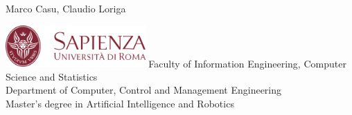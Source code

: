 \documentclass[10pt, letterpaper]{report}
\title{\titolo} %
\author{Marco Casu, Claudio Loriga}
\date{\vspace{-5ex}}
\begin{document}
\begin{titlepage}

	\begin{center}
		\HUGE Marco Casu, Claudio Loriga\acc
	\end{center}
	\thispagestyle{empty}
	\begin{figure}[h]
	\end{figure}
	\vfill
	\centering \includegraphics[width=0.4\textwidth ]{preamble/Stemma_sapienza.png} \acc
	\centering \Large \color{sapienza}Faculty of Information Engineering, Computer Science and Statistics\\
	Department of Computer, Control and Management Engineering\\
	Master's degree in Artificial Intelligence and Robotics
\end{titlepage}
\end{document}
